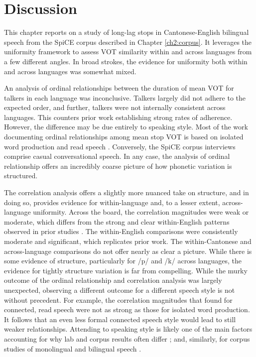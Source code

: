 \section{Discussion}

This chapter reports on a study of long-lag stops in Cantonese-English bilingual speech from the SpiCE corpus described in Chapter \ref{ch2:corpus}. It leverages the uniformity framework to assess VOT similarity within and across languages from a few different angles. In broad strokes, the evidence for uniformity both within and across languages was somewhat mixed. 

An analysis of ordinal relationships between the duration of mean VOT for talkers in each language was inconclusive. Talkers largely did not adhere to the expected order, and further, talkers were not internally consistent across languages. This counters prior work establishing strong rates of adherence. However, the difference may be due entirely to speaking style. Most of the work documenting ordinal relationships among mean stop VOT is based on isolated word production and read speech \citep[e.g.,][]{chodroff_2017_structure,cho_1999_vot,lisker_1964_vot}. Conversely, the SpiCE corpus interviews comprise casual conversational speech. In any case, the analysis of ordinal relationship offers an incredibly coarse picture of how phonetic variation is structured.

The correlation analysis offers a slightly more nuanced take on structure, and in doing so, provides evidence for within-language and, to a lesser extent, across-language uniformity. Across the board, the correlation magnitudes were weak or moderate, which differs from the strong and clear within-English patterns observed in prior studies \citep{chodroff_2017_structure, chodroff_2019_l2}. The within-English comparisons were consistently moderate and significant, which replicates prior work. The within-Cantonese and across-language comparisons do not offer nearly as clear a picture. While there is some evidence of structure, particularly for /p/ and /k/ across languages, the evidence for tightly structure variation is far from compelling. While the murky outcome of the ordinal relationship and correlation analysis was largely unexpected, observing a different outcome for a different speech style is not without precedent. For example, the correlation magnitudes that \citet{chodroff_2017_structure} found for connected, read speech were not as strong as those for isolated word production. It follows that an even less formal connected speech style would lead to still weaker relationships. Attending to speaking style is likely one of the main factors accounting for why lab and corpus results often differ \citep{gahl_2012_reduce,chodroff_2017_structure}; and, similarly, for corpus studies of monolingual and bilingual speech \cite{johnson_2019_probabilistic}. 

